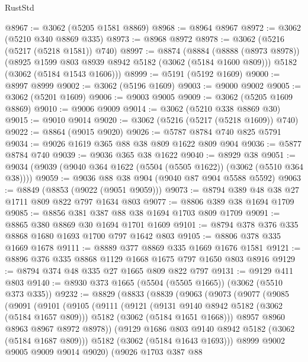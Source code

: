 \begin{lexlean}{RustStd}
\begin{coremodule}
@8967 := @3062 (@5205 @1581 @8869)
@8968 := @8964 @8967
@8972 := @3062 (@5210 @340 @8869 @335)
@8973 := @8968 @8972
@8978 := @3062 (@5216 (@5217 (@5218 @1581)) @740)
@8997 := @8874
    (@8884
      (@8888 (@8973 @8978))
      (@8925 @1599 @803 @8939 @8942 @5182 (@3062 (@5184 @1600 @809)))
      @5182
      (@3062 (@5184 @1543 @1606)))
@8999 := @5191 (@5192 @1609)
@9000 := @8997 @8999
@9002 := @3062 (@5196 @1609)
@9003 := @9000 @9002
@9005 := @3062 (@5201 @1609)
@9006 := @9003 @9005
@9009 := @3062 (@5205 @1609 @8869)
@9010 := @9006 @9009
@9014 := @3062 (@5210 @338 @8869 @30)
@9015 := @9010 @9014
@9020 := @3062 (@5216 (@5217 (@5218 @1609)) @740)
@9022 := @8864 (@9015 @9020)
@9026 := @5787 @8784 @740 @825 @5791
@9034 := @9026 @1619 @365 @88 @38 @809 @1622 @809 @904
@9036 := @5877 @8784 @740
@9039 := @9036 @365 @38 @1622
@9040 := @8929 @38
@9051 := @9034 (@9039 (@9040 @364 @1622 (@5504 (@5505 @1622)) (@3062 (@5510 @364 @38))))
@9059 := @9036 @88 @38 @904 (@9040 @87 @904 @5588 @5592)
@9063 := @8849 (@8853 (@9022 (@9051 @9059)))
@9073 := @8794 @389 @48 @38 @27 @1711 @809 @822 @797 @1634 @803
@9077 := @8806 @389 @38 @1694 @1709
@9085 := @8856 @381 @387 @88 @38 @1694 @1703 @809 @1709
@9091 := @8865 @380 @8869 @30 @1694 @1701 @1609
@9101 := @8794 @378 @376 @335 @8868 @1680 @1693 @1700 @797 @1642 @803
@9105 := @8806 @378 @335 @1669 @1678
@9111 := @8889 @377 @8869 @335 @1669 @1676 @1581
@9121 := @8896 @376 @335 @8868 @1129 @1668 @1675 @797 @1650 @803 @8916
@9129 := @8794 @374 @48 @335 @27 @1665 @809 @822 @797
@9131 := @9129 @411 @803
@9140 := @8930 @373 @1665 (@5504 (@5505 @1665)) (@3062 (@5510 @373 @335))
@9232 := @8829
    (@8833
      (@8839
        (@9063
          (@9073
            (@9077
              (@9085
                (@9091
                  (@9101
                    (@9105
                      (@9111
                        (@9121
                          (@9131 @9140 @8942 @5182 (@3062 (@5184 @1657 @809)))
                          @5182
                          (@3062 (@5184 @1651 @1668)))
                        @8957
                        @8960
                        @8963
                        @8967
                        @8972
                        @8978))
                    (@9129 @1686 @803 @9140 @8942 @5182 (@3062 (@5184 @1687 @809)))
                    @5182
                    (@3062 (@5184 @1643 @1693)))
                  @8999
                  @9002
                  @9005
                  @9009
                  @9014
                  @9020)
                (@9026
                  @1703
                  @387
                  @88

\end{coremodule}
\end{lexlean}

